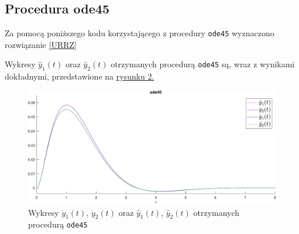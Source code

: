\documentclass[a4paper, 12pt, twoside, openany]{article}
\begin{document}
    \subsection{Procedura ode45}
    Za pomocą poniższego kodu korzystającego z procedury \texttt{ode45} wyznaczono rozwiązanie \eqref{URRZ}
    
    Wykresy $\hat{y}_1(t)$ oraz $\hat{y}_2(t)$ otrzymanych procedurą \texttt{ode45} są, wraz z wynikami dokładnymi, przedstawione na \hyperref[fig:rys2]{rysunku 2.}
    \begin{figure}[H]
        \centering
        \includegraphics[width=\linewidth]{wykres1t.pdf}
        \caption{Wykresy $\dot{y}_1(t)$, $\dot{y}_2(t)$ oraz $\hat{y}_1(t)$, $\hat{y}_2(t)$ otrzymanych procedurą \texttt{ode45} }
        \label{fig:rys2} %
    \end{figure}
\end{document}
